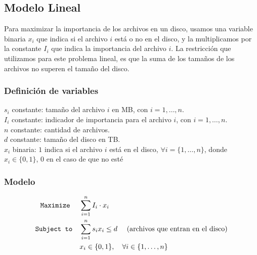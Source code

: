 \documentclass[11pt, a4paper, pdftex]{article}
\begin{document}
\subsection{Modelo Lineal}

Para maximizar la importancia de los archivos en un disco, usamos una
variable binaria $x_i$ que indica si el archivo $i$ está o no en el
disco, y la multiplicamos por la constante $I_{i}$ que indica la
importancia del archivo $i$. La restricción que utilizamos para este
problema lineal, es que la suma de los tamaños de los archivos no superen
el tamaño del disco. 

\subsubsection{Definición de variables}


\noindent $s_{i}$ constante: tamaño del archivo $i$ en MB, con $i = 1, \ldots, n$. \\

\noindent $I_i$ constante: indicador de importancia para el archivo $i$, con $i = 1, \ldots, n$. \\

\noindent $n$ constante: cantidad de archivos. \\

\noindent $d$ constante: tamaño del disco en TB. \\

\noindent $x_{i}$ binaria: $1$ indica si el archivo $i$ está en el disco, $\forall i = \{1, \ldots, n\}$, donde $x_{i} \in \{0, 1\}$, $0$ en el caso de que no esté

\subsubsection{Modelo}

\begin{alignat*}{2}
	\texttt{Maximize}\quad\,\,
	& \sum_{i = 1}^{n} I_{i} \cdot x_{i}\\
	\texttt{Subject to}\quad
	& \sum_{i = 1}^{n} s_{i} x_{i} \le d\ \quad\text{(archivos que entran en el disco)}\\
	& x_{i} \in \{0,1\}, \quad \forall i \in \{1, \ldots, n\} \\
\end{alignat*}
\end{document}
